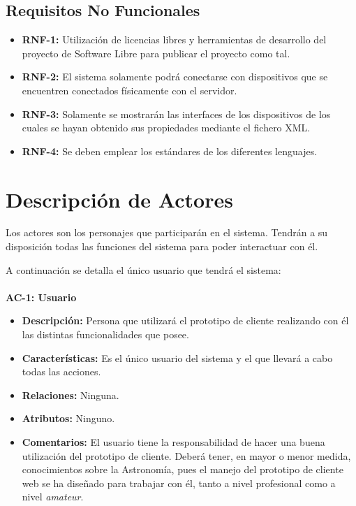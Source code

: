 \subsection{Requisitos No Funcionales}
\begin{itemize}
  \item \textbf{RNF-1:} Utilización de licencias libres y herramientas de desarrollo del proyecto de Software Libre para publicar el proyecto como tal.
  \item \textbf{RNF-2:} El sistema solamente podrá conectarse con dispositivos que se encuentren conectados físicamente con el servidor.
  \item \textbf{RNF-3:} Solamente se mostrarán las interfaces de los dispositivos de los cuales se hayan obtenido sus propiedades mediante el fichero XML.
  \item \textbf{RNF-4:} Se deben emplear los estándares de los diferentes lenguajes.
\end{itemize}

\section{Descripción de Actores}
Los actores son los personajes que participarán en el sistema. Tendrán a su disposición todas las funciones del sistema para poder interactuar con él.

A continuación se detalla el único usuario que tendrá el sistema:\\ \\
\textbf{AC-1: Usuario}
\begin{itemize}
  \item \textbf{Descripción:} Persona que utilizará el prototipo de cliente realizando con él las distintas funcionalidades que posee.
  \item \textbf{Características:} Es el único usuario del sistema y el que llevará a cabo todas las acciones.
  \item \textbf{Relaciones:} Ninguna.
  \item \textbf{Atributos:} Ninguno.
  \item \textbf{Comentarios:} El usuario tiene la responsabilidad de hacer una buena utilización del prototipo de cliente. Deberá tener, en mayor o menor medida, conocimientos sobre la Astronomía, pues el manejo del prototipo de cliente web se ha diseñado para trabajar con él, tanto a nivel profesional como a nivel \textit{amateur}.
\end{itemize}

